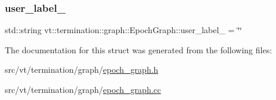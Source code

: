 \mbox{\label{structvt_1_1termination_1_1graph_1_1_epoch_graph_ab999242f776318d97475ccbe6a362c71}} 
\subsubsection{\texorpdfstring{user\+\_\+label\+\_\+}{user\_label\_}}
{\footnotesize\ttfamily std\+::string vt\+::termination\+::graph\+::\+Epoch\+Graph\+::user\+\_\+label\+\_\+ = \char`\"{}\char`\"{}\hspace{0.3cm}{\ttfamily [private]}}



The documentation for this struct was generated from the following files\+:\begin{DoxyCompactItemize}
\item 
src/vt/termination/graph/\hyperlink{epoch__graph_8h}{epoch\+\_\+graph.\+h}\item 
src/vt/termination/graph/\hyperlink{epoch__graph_8cc}{epoch\+\_\+graph.\+cc}\end{DoxyCompactItemize}
